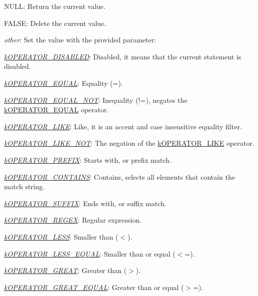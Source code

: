 \begin{DoxyItemize}
\item {\ttfamily N\-U\-L\-L}\-: Return the current value. 
\item {\ttfamily F\-A\-L\-S\-E}\-: Delete the current value. 
\item {\itshape other}\-: Set the value with the provided parameter\-: 
\begin{DoxyItemize}
\item {\itshape \hyperlink{}{k\-O\-P\-E\-R\-A\-T\-O\-R\-\_\-\-D\-I\-S\-A\-B\-L\-E\-D}}\-: Disabled, it means that the current statement is disabled. 
\item {\itshape \hyperlink{}{k\-O\-P\-E\-R\-A\-T\-O\-R\-\_\-\-E\-Q\-U\-A\-L}}\-: Equality ({\ttfamily =}). 
\item {\itshape \hyperlink{}{k\-O\-P\-E\-R\-A\-T\-O\-R\-\_\-\-E\-Q\-U\-A\-L\-\_\-\-N\-O\-T}}\-: Inequality ({\ttfamily !=}), negates the \hyperlink{}{k\-O\-P\-E\-R\-A\-T\-O\-R\-\_\-\-E\-Q\-U\-A\-L} operator. 
\item {\itshape \hyperlink{}{k\-O\-P\-E\-R\-A\-T\-O\-R\-\_\-\-L\-I\-K\-E}}\-: Like, it is an accent and case insensitive equality filter. 
\item {\itshape \hyperlink{}{k\-O\-P\-E\-R\-A\-T\-O\-R\-\_\-\-L\-I\-K\-E\-\_\-\-N\-O\-T}}\-: The negation of the \hyperlink{}{k\-O\-P\-E\-R\-A\-T\-O\-R\-\_\-\-L\-I\-K\-E} operator. 
\item {\itshape \hyperlink{}{k\-O\-P\-E\-R\-A\-T\-O\-R\-\_\-\-P\-R\-E\-F\-I\-X}}\-: Starts with, or prefix match. 
\item {\itshape \hyperlink{}{k\-O\-P\-E\-R\-A\-T\-O\-R\-\_\-\-C\-O\-N\-T\-A\-I\-N\-S}}\-: Contains, selects all elements that contain the match string. 
\item {\itshape \hyperlink{}{k\-O\-P\-E\-R\-A\-T\-O\-R\-\_\-\-S\-U\-F\-F\-I\-X}}\-: Ends with, or suffix match. 
\item {\itshape \hyperlink{}{k\-O\-P\-E\-R\-A\-T\-O\-R\-\_\-\-R\-E\-G\-E\-X}}\-: Regular expression. 
\item {\itshape \hyperlink{}{k\-O\-P\-E\-R\-A\-T\-O\-R\-\_\-\-L\-E\-S\-S}}\-: Smaller than ({\ttfamily $<$}). 
\item {\itshape \hyperlink{}{k\-O\-P\-E\-R\-A\-T\-O\-R\-\_\-\-L\-E\-S\-S\-\_\-\-E\-Q\-U\-A\-L}}\-: Smaller than or equal ({\ttfamily $<$=}). 
\item {\itshape \hyperlink{}{k\-O\-P\-E\-R\-A\-T\-O\-R\-\_\-\-G\-R\-E\-A\-T}}\-: Greater than ({\ttfamily $>$}). 
\item {\itshape \hyperlink{}{k\-O\-P\-E\-R\-A\-T\-O\-R\-\_\-\-G\-R\-E\-A\-T\-\_\-\-E\-Q\-U\-A\-L}}\-: Greater than or equal ({\ttfamily $>$=}). 

\end{DoxyItemize}
\end{DoxyItemize}
